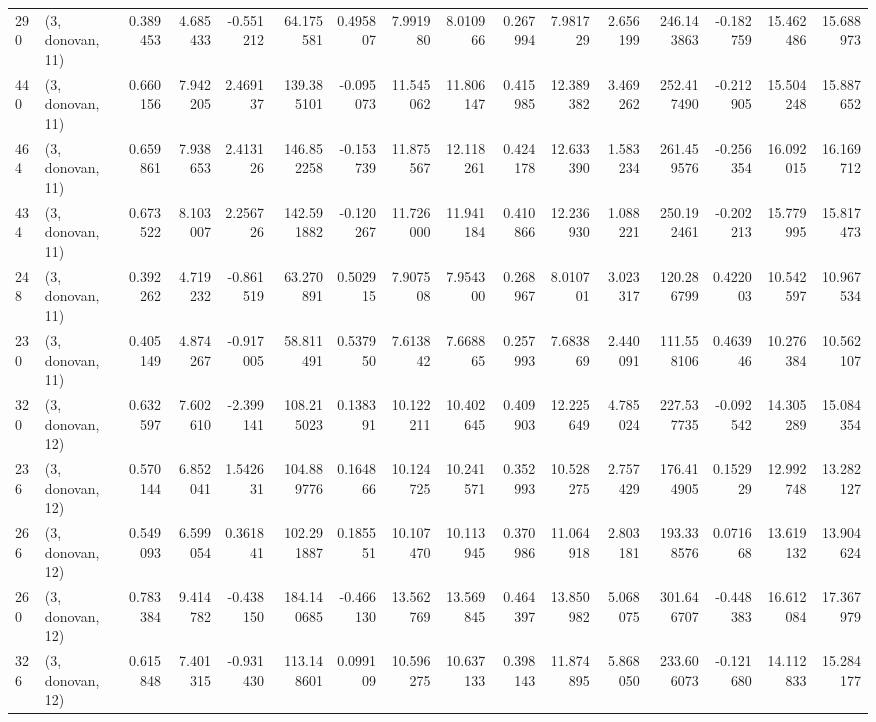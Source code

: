 \begin{tabular}{llrrrrrrrrrrrrrr}
290 &  (3, donovan, 11) &   0.389453 &   4.685433 &  -0.551212 &    64.175581 &   0.495807 &   7.991980 &   8.010966 &  0.267994 &   7.981729 &   2.656199 &   246.143863 &  -0.182759 &  15.462486 &  15.688973 \\
440 &  (3, donovan, 11) &   0.660156 &   7.942205 &   2.469137 &   139.385101 &  -0.095073 &  11.545062 &  11.806147 &  0.415985 &  12.389382 &   3.469262 &   252.417490 &  -0.212905 &  15.504248 &  15.887652 \\
464 &  (3, donovan, 11) &   0.659861 &   7.938653 &   2.413126 &   146.852258 &  -0.153739 &  11.875567 &  12.118261 &  0.424178 &  12.633390 &   1.583234 &   261.459576 &  -0.256354 &  16.092015 &  16.169712 \\
434 &  (3, donovan, 11) &   0.673522 &   8.103007 &   2.256726 &   142.591882 &  -0.120267 &  11.726000 &  11.941184 &  0.410866 &  12.236930 &   1.088221 &   250.192461 &  -0.202213 &  15.779995 &  15.817473 \\
248 &  (3, donovan, 11) &   0.392262 &   4.719232 &  -0.861519 &    63.270891 &   0.502915 &   7.907508 &   7.954300 &  0.268967 &   8.010701 &   3.023317 &   120.286799 &   0.422003 &  10.542597 &  10.967534 \\
230 &  (3, donovan, 11) &   0.405149 &   4.874267 &  -0.917005 &    58.811491 &   0.537950 &   7.613842 &   7.668865 &  0.257993 &   7.683869 &   2.440091 &   111.558106 &   0.463946 &  10.276384 &  10.562107 \\
320 &  (3, donovan, 12) &   0.632597 &   7.602610 &  -2.399141 &   108.215023 &   0.138391 &  10.122211 &  10.402645 &  0.409903 &  12.225649 &   4.785024 &   227.537735 &  -0.092542 &  14.305289 &  15.084354 \\
236 &  (3, donovan, 12) &   0.570144 &   6.852041 &   1.542631 &   104.889776 &   0.164866 &  10.124725 &  10.241571 &  0.352993 &  10.528275 &   2.757429 &   176.414905 &   0.152929 &  12.992748 &  13.282127 \\
266 &  (3, donovan, 12) &   0.549093 &   6.599054 &   0.361841 &   102.291887 &   0.185551 &  10.107470 &  10.113945 &  0.370986 &  11.064918 &   2.803181 &   193.338576 &   0.071668 &  13.619132 &  13.904624 \\
260 &  (3, donovan, 12) &   0.783384 &   9.414782 &  -0.438150 &   184.140685 &  -0.466130 &  13.562769 &  13.569845 &  0.464397 &  13.850982 &   5.068075 &   301.646707 &  -0.448383 &  16.612084 &  17.367979 \\
326 &  (3, donovan, 12) &   0.615848 &   7.401315 &  -0.931430 &   113.148601 &   0.099109 &  10.596275 &  10.637133 &  0.398143 &  11.874895 &   5.868050 &   233.606073 &  -0.121680 &  14.112833 &  15.284177 \\

\end{tabular}
